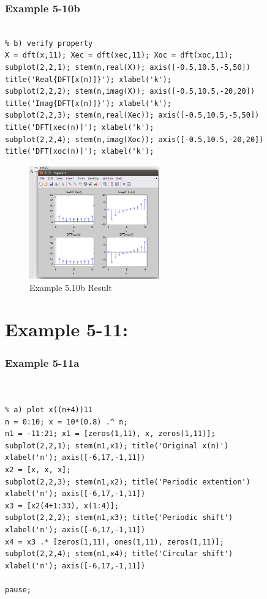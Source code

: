 \documentclass[11pt
  , a4paper
  , article
  , oneside
]{memoir}
\begin{document}
\subsection{Example 5-10b}
\begin{lstlisting}[style=termstyle]
% Example 5-10b

% b) verify property
X = dft(x,11); Xec = dft(xec,11); Xoc = dft(xoc,11);
subplot(2,2,1); stem(n,real(X)); axis([-0.5,10.5,-5,50])
title('Real{DFT[x(n)]}'); xlabel('k');
subplot(2,2,2); stem(n,imag(X)); axis([-0.5,10.5,-20,20])
title('Imag{DFT[x(n)]}'); xlabel('k');
subplot(2,2,3); stem(n,real(Xec)); axis([-0.5,10.5,-5,50])
title('DFT[xec(n)]'); xlabel('k');
subplot(2,2,4); stem(n,imag(Xoc)); axis([-0.5,10.5,-20,20])
title('DFT[xoc(n)]'); xlabel('k');

\end{lstlisting}

\begin{figure}[h!]
	\centering
	\includegraphics[width=0.5\textwidth,height=0.4\textwidth]{./images/ex510b.png}
	\caption{Example 5.10b Result}
	\label{fig:Example 5.10b Result}
\end{figure}


\chapter{Example 5-11:}
\subsection{Example 5-11a}
\begin{lstlisting}[style=termstyle]
% Example 5-11


% a) plot x((n+4))11
n = 0:10; x = 10*(0.8) .^ n;
n1 = -11:21; x1 = [zeros(1,11), x, zeros(1,11)];
subplot(2,2,1); stem(n1,x1); title('Original x(n)')
xlabel('n'); axis([-6,17,-1,11])
x2 = [x, x, x];
subplot(2,2,3); stem(n1,x2); title('Periodic extention')
xlabel('n'); axis([-6,17,-1,11])
x3 = [x2(4+1:33), x(1:4)];
subplot(2,2,2); stem(n1,x3); title('Periodic shift')
xlabel('n'); axis([-6,17,-1,11])
x4 = x3 .* [zeros(1,11), ones(1,11), zeros(1,11)];
subplot(2,2,4); stem(n1,x4); title('Circular shift')
xlabel('n'); axis([-6,17,-1,11])

pause;
\end{lstlisting}
\end{document}
